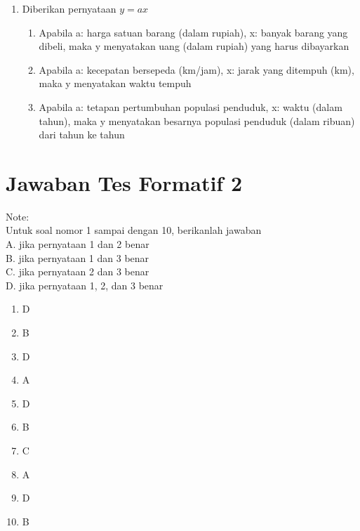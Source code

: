 \documentclass[10pt]{article}
\begin{document}
\begin{enumerate}
\begin{enumerate}
    (dalam jutaan rupiah), y: banyaknya uang Badu (dalam jutaan
    rupiah).
    \item hubungan antara 2 bilangan, jika x: bilangan pertama, y: bilangan
    kedua
    \item hubungan umur Ali dan Badu, jika x: umur Ali (dalam tahun) dan y:
    umur Badu (dalam tahun)
\end{enumerate}
\item Diberikan pernyataan $y=ax$
\begin{enumerate}
    \item Apabila a: harga satuan barang (dalam rupiah), x: banyak barang
    yang dibeli, maka y menyatakan uang (dalam rupiah) yang harus
    dibayarkan
    \item Apabila a: kecepatan bersepeda (km/jam), x: jarak yang ditempuh
    (km), maka y menyatakan waktu tempuh
    \item Apabila a: tetapan pertumbuhan populasi penduduk, x: waktu
(dalam tahun), maka y menyatakan besarnya populasi penduduk
(dalam ribuan) dari tahun ke tahun
\end{enumerate}
    \end{enumerate}
    \section*{Jawaban Tes Formatif 2}
    Note:\\
    Untuk soal nomor 1 sampai dengan 10, berikanlah jawaban
    \\A. jika pernyataan 1 dan 2 benar
    \\B. jika pernyataan 1 dan 3 benar
    \\C. jika pernyataan 2 dan 3 benar
    \\D. jika pernyataan 1, 2, dan 3 benar
    \begin{enumerate}
        \item D
        \item B
        \item D
        \item A
        \item D
        \item B
        \item C
        \item A
        \item D
        \item B
    \end{enumerate}
\end{document}
